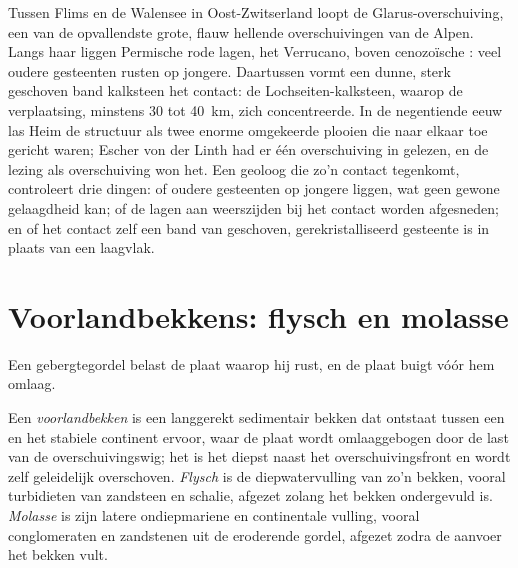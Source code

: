 \begin{inthefield}
Tussen Flims en de Walensee in Oost-Zwitserland loopt de Glarus-overschuiving, een van de
opvallendste grote, flauw hellende overschuivingen van de Alpen. Langs haar liggen Permische rode lagen, het
Verrucano, boven cenozoïsche : veel oudere gesteenten rusten op jongere. Daartussen vormt een
dunne, sterk geschoven band kalksteen het contact: de Lochseiten-kalksteen, waarop de verplaatsing, minstens 30 tot
\qty{40}{km}, zich concentreerde. In de negentiende eeuw las Heim de structuur als twee enorme
omgekeerde plooien die naar elkaar toe gericht waren; Escher von der Linth had er één overschuiving in gelezen, en de lezing als overschuiving won het. Een geoloog die zo'n contact tegenkomt, controleert
drie dingen: of oudere gesteenten op jongere liggen, wat geen gewone gelaagdheid kan;
of de lagen aan weerszijden bij het contact worden afgesneden; en of het contact
zelf een band van geschoven, gerekristalliseerd gesteente is in plaats van een laagvlak.
\end{inthefield}

\section{Voorlandbekkens: flysch en molasse}\label{sec:b2:alpine-orogen:foreland}

Een gebergtegordel belast de plaat waarop hij rust, en de plaat buigt vóór hem omlaag.

\begin{definition}\label{def:b2:alpine-orogen:foreland}
Een \emph{voorlandbekken} is een langgerekt sedimentair bekken dat ontstaat
tussen een  en het stabiele continent ervoor, waar de plaat wordt omlaaggebogen door
de last van de overschuivingswig; het is het diepst naast het overschuivingsfront en wordt zelf
geleidelijk overschoven. \emph{Flysch} is de diepwatervulling van zo'n
bekken, vooral turbidieten van zandsteen en schalie, afgezet zolang het bekken ondergevuld is.
\emph{Molasse} is zijn latere ondiepmariene en continentale vulling, vooral
conglomeraten en zandstenen uit de eroderende gordel, afgezet zodra de aanvoer het
bekken vult.
\end{definition}

